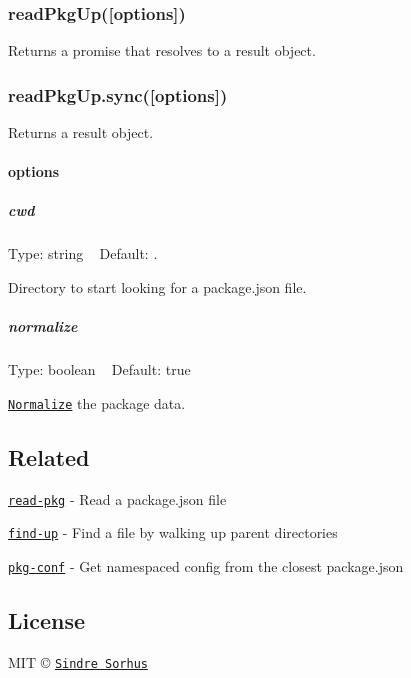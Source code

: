 \subsubsection*{read\+Pkg\+Up(\mbox{[}options\mbox{]})}

Returns a promise that resolves to a result object.

\subsubsection*{read\+Pkg\+Up.\+sync(\mbox{[}options\mbox{]})}

Returns a result object.

\paragraph*{options}

\subparagraph*{cwd}

Type\+: {\ttfamily string} ~\newline
Default\+: {\ttfamily .}

Directory to start looking for a package.\+json file.

\subparagraph*{normalize}

Type\+: {\ttfamily boolean} ~\newline
Default\+: {\ttfamily true}

\href{https://github.com/npm/normalize-package-data#what-normalization-currently-entails}{\tt Normalize} the package data.

\subsection*{Related}


\begin{DoxyItemize}
\item \href{https://github.com/sindresorhus/read-pkg}{\tt read-\/pkg} -\/ Read a package.\+json file
\item \href{https://github.com/sindresorhus/find-up}{\tt find-\/up} -\/ Find a file by walking up parent directories
\item \href{https://github.com/sindresorhus/pkg-conf}{\tt pkg-\/conf} -\/ Get namespaced config from the closest package.\+json
\end{DoxyItemize}

\subsection*{License}

M\+IT © \href{http://sindresorhus.com}{\tt Sindre Sorhus} 